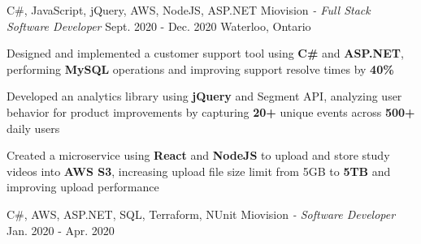 \begin{siderules}
  \begin{cventries}
    \cventry
    {C\#, JavaScript, jQuery, AWS, NodeJS, ASP.NET}
    {Miovision\hspace{0.15em} \bodyfontlight\itshape{- Full Stack Software Developer}}
    {Sept. 2020 - Dec. 2020}
    {Waterloo, Ontario}
    {
      \begin{cvitems}
        \item{Designed and implemented a customer support tool using \textbf{C\#} and \textbf{ASP.NET}, performing \textbf{MySQL} operations and improving support resolve times by \textbf{40\%} }
        \item{Developed an analytics library using \textbf{jQuery} and Segment API, analyzing user behavior for product improvements by capturing \textbf{20+} unique events across \textbf{500+} daily users}
        \item {Created a microservice using \textbf{React} and \textbf{NodeJS} to upload and store study videos into \textbf{AWS S3}, increasing upload file size limit from 5GB to \textbf{5TB} and improving upload performance }
      \end{cvitems}
    }
    \cventry
    {C\#, AWS, ASP.NET, SQL, Terraform, NUnit}
    {Miovision\hspace{0.15em} \bodyfontlight\itshape{- Software Developer}}
    {Jan. 2020 - Apr. 2020}

\end{cventries}
\end{siderules}
